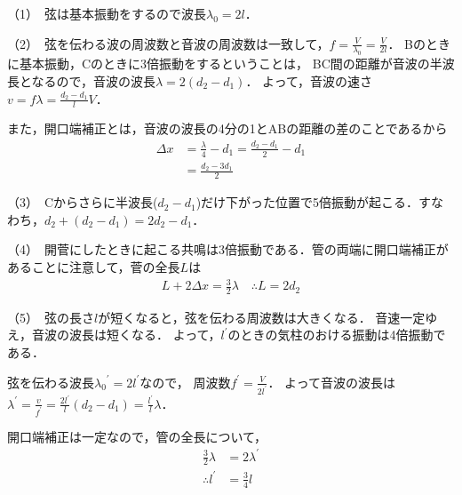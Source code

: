 \begin{comment}

\end{comment}

\noindent （1）\,
弦は基本振動をするので波長$\lambda_0 = 2l$．

\noindent （2）\,
弦を伝わる波の周波数と音波の周波数は一致して，$f=\frac{V}{\lambda_0}=\frac{V}{2l}$．
Bのときに基本振動，Cのときに3倍振動をするということは，
BC間の距離が音波の半波長となるので，音波の波長$\lambda =2(d_2-d_1)$．
よって，音波の速さ$v=f\lambda =\frac{d_2-d_1}{l}V$．

また，開口端補正とは，音波の波長の4分の1とABの距離の差のことであるから
\begin{align*}
  \Delta x &= \frac{\lambda}{4}-d_1 = \frac{d_2-d_1}{2}-d_1 \\
  &= \frac{d_2-3d_1}{2}
\end{align*}


\noindent （3）\,
Cからさらに半波長($d_2-d_1$)だけ下がった位置で5倍振動が起こる．すなわち，\mbox{$d_2+(d_2-d_1)=2d_2-d_1$．}

\noindent （4）\,
開菅にしたときに起こる共鳴は3倍振動である．管の両端に開口端補正があることに注意して，菅の全長$L$は
\begin{align*}
  L+2\Delta x = \frac{3}{2}\lambda \quad
  \therefore L = 2d_2
\end{align*}

\noindent （5）\,
弦の長さ$l$が短くなると，弦を伝わる周波数は大きくなる．
音速一定ゆえ，音波の波長は短くなる．
よって，$l^\prime$のときの気柱のおける振動は4倍振動である．

弦を伝わる波長${\lambda_0}^\prime = 2l^\prime$なので，
周波数$f^\prime = \frac{V}{2l^\prime}$．
よって音波の波長は\mbox{$\lambda^\prime = \frac{v}{f^\prime}=\frac{2l^\prime}{l}(d_2-d_1)=\frac{l^\prime}{l}\lambda$}．

開口端補正は一定なので，管の全長について，
\begin{align*}
  \frac{3}{2}\lambda &= 2\lambda^\prime \\
  \therefore l^\prime &= \frac{3}{4}l
\end{align*}


